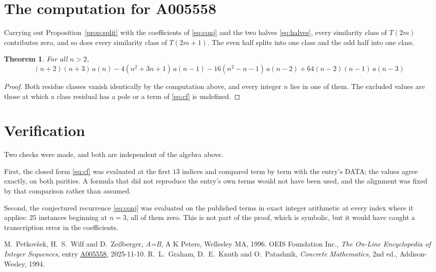 \documentclass[11pt,a4paper]{article}
\theoremstyle{plain}
\newtheorem{theorem}{Theorem}
\theoremstyle{definition}
\begin{document}
\section{The computation for A005558}

Carrying out Proposition~\ref{prop:split} with the coefficients of \eqref{eq:conj} and the
two halves \eqref{eq:halves}, every similarity class of $T(2m)$ contributes zero, and so
does every similarity class of $T(2m+1)$. The even half splits into one class
and the odd half into one class.

\begin{theorem}
For all $n> 2$,
\[
\left(n + 2\right) \left(n + 3\right)\,a(n) -  4 \left(n^{2} + 3 n + 1\right)\,a(n-1) -  16 \left(n^{2} - n - 1\right)\,a(n-2) + 64 \left(n - 2\right) \left(n - 1\right)\,a(n-3)
\]
\end{theorem}

\begin{proof}
Both residue classes vanish identically by the computation above, and every integer $n$
lies in one of them. The excluded values are those at which a class residual has a pole or
a term of \eqref{eq:cf} is undefined.
\end{proof}

\section{Verification}

Two checks were made, and both are independent of the algebra above.

First, the closed form \eqref{eq:cf} was evaluated at the first $13$ indices and
compared term by term with the entry's DATA; the values agree exactly, on both parities. A
formula that did not reproduce the entry's own terms would not have been used, and the
alignment was fixed by that comparison rather than assumed.

Second, the conjectured recurrence \eqref{eq:conj} was evaluated on the published terms in
exact integer arithmetic at every index where it applies: $25$ instances beginning at
$n=3$, all of them zero. This is not part of the proof, which is symbolic, but it
would have caught a transcription error in the coefficients.

\begin{thebibliography}{9}
 M.~Petkov\v{s}ek, H.~S.~Wilf and D.~Zeilberger, \emph{A=B}, A K Peters,
Wellesley MA, 1996.
 OEIS Foundation Inc., \emph{The On-Line Encyclopedia of Integer Sequences},
entry \href{https://oeis.org/A005558}{A005558}, 2025-11-10.
 R.~L.~Graham, D.~E.~Knuth and O.~Patashnik, \emph{Concrete Mathematics},
2nd ed., Addison-Wesley, 1994.
\end{thebibliography}
\end{document}
